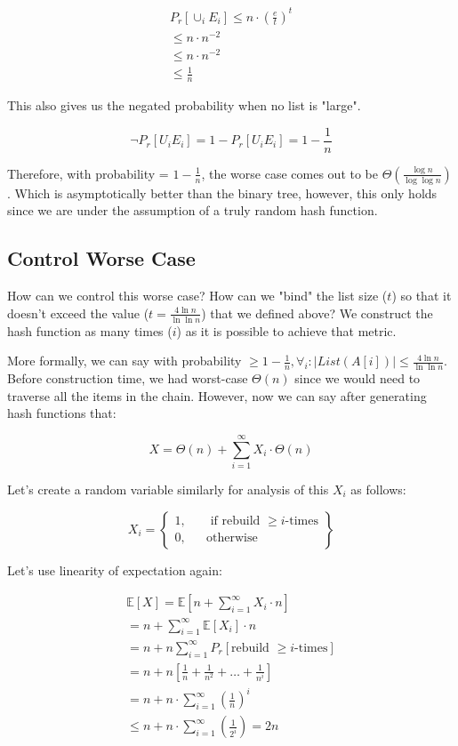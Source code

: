 \documentclass{article}
\begin{document}
\begin{align*}
    P_r[\cup_i E_i] \leq n \cdot \left(\frac{e}{t}\right)^t \\
    \leq n \cdot n^{-2} \\
    \leq n \cdot n^{-2} \\
    \leq \frac{1}{n}
\end{align*}

This also gives us the negated probability when no list is "large".

$$
\neg P_r[U_i E_i] = 1 - P_r[U_i E_i] = 1 - \frac{1}{n}
$$

Therefore, with probability = $1- \frac{1}{n}$, the worse case comes out to be $\Theta\left(\frac{\log n}{\log \log n}\right)$. Which is asymptotically better than the binary tree, however, this only holds since we are under the assumption of a truly random hash function.

\subsection{Control Worse Case}

How can we control this worse case? How can we "bind" the list size ($t$) so that it doesn't exceed the value ($t = \frac{4 \ln n}{\ln \ln n}$) that we defined above? We construct the hash function as many times ($i$) as it is possible to achieve that metric.

More formally, we can say with probability $\geq 1 - \frac{1}{n}, \forall_i: |List(A[i])| \leq \frac{4 \ln n}{\ln \ln n}$. Before construction time, we had worst-case $\Theta(n)$ since we would need to traverse all the items in the chain. However, now we can say after generating hash functions that:

$$
X = \Theta(n) + \sum_{i=1}^{\infty} X_i \cdot \Theta(n)
$$

Let's create a random variable similarly for analysis of this $X_i$ as follows:

$$
X_i = \left\{
\begin{matrix}
    1, && \text{ if rebuild } \geq i \text{-times} \\
    0, && \text{otherwise}
\end{matrix}
\right\}
$$

Let's use linearity of expectation again:

\begin{align*}
    \mathbb E[X] = \mathbb E[n + \sum_{i=1}^{\infty} X_i \cdot n] \\
    = n +  \sum_{i=1}^{\infty} \mathbb E[X_i] \cdot n \\
    = n + n \sum_{i=1}^{\infty} P_r[\text{rebuild } \geq i\text{-times}] \\
    = n + n \left[\frac{1}{n} + \frac{1}{n^2} + \ldots + \frac{1}{n^i} \right] \\
    = n + n \cdot \sum_{i=1}^{\infty} \left(\frac{1}{n}\right)^{i} \\
    \leq  n + n \cdot \sum_{i=1}^{\infty} \left(\frac{1}{2^i}\right) = 2n
\end{align*}
\end{document}

